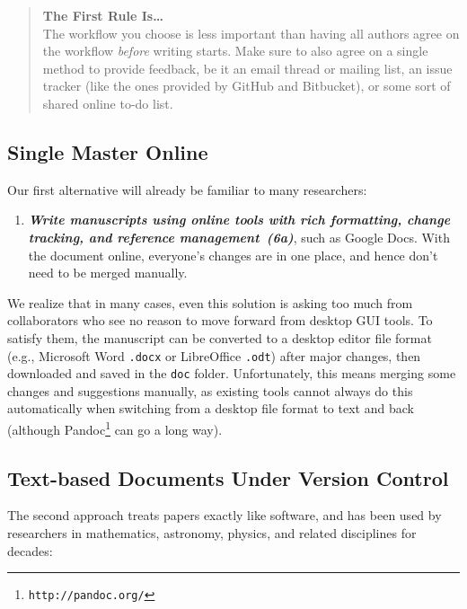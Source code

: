 \documentclass[10pt,letterpaper]{article}
\newcommand{\withurl}[2]{{#1}\footnote{{\texttt{#2}}}}
\newcommand{\practice}[2]{\textbf{\emph{{#2}~({#1})}}}
\begin{document}
\begin{quote}
  \noindent \textbf{The First Rule Is{\ldots}}
  \\
  The workflow you choose is less important than having all authors
  agree on the workflow \emph{before} writing starts. Make sure to
  also agree on a single method to provide feedback, be it an email
  thread or mailing list, an issue tracker (like the ones provided by
  GitHub and Bitbucket), or some sort of shared online to-do list.
\end{quote}

\subsection*{Single Master Online}

Our first alternative will already be familiar to many researchers:

\begin{enumerate}

\item

  \practice{6a}{Write manuscripts using online tools with rich
  formatting, change tracking, and reference management}, such as
  Google Docs. With the document online, everyone's changes are in one
  place, and hence don't need to be merged manually.

\end{enumerate}

We realize that in many cases, even this solution is asking too much
from collaborators who see no reason to move forward from desktop GUI
tools. To satisfy them, the manuscript can be converted to a desktop
editor file format (e.g., Microsoft
Word \texttt{.docx} or LibreOffice \texttt{.odt}) after major changes,
then downloaded and saved in the \texttt{doc} folder. Unfortunately,
this means merging some changes and suggestions manually, as existing
tools cannot always do this automatically when switching from a
desktop file format to text and back (although
\withurl{Pandoc}{http://pandoc.org/} can go a long way).

\subsection*{Text-based Documents Under Version Control}

The second approach treats papers exactly like software, and has been
used by researchers in mathematics, astronomy, physics, and related
disciplines for decades:
\end{document}
